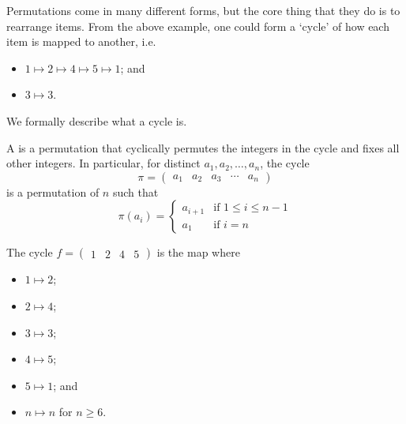 Permutations come in many different forms, but the core thing that they do is to rearrange items. From the above example, one could form a `cycle' of how each item is mapped to another, i.e.
\begin{itemize}
    \item $1 \mapsto 2 \mapsto 4 \mapsto 5 \mapsto 1$; and
    \item $3 \mapsto 3$.
\end{itemize}
We formally describe what a cycle is.
\begin{definition}
    A  is a permutation that cyclically permutes the integers in the cycle and fixes all other integers. In particular, for distinct $a_1, a_2, \dots, a_n$, the cycle
    \[
        \pi = \begin{pmatrix}a_1&a_2&a_3&\cdots&a_n\end{pmatrix}
    \]
    is a permutation of  $n$ such that
    \[
        \pi(a_i) = \begin{cases}
            a_{i+1}& \text{if } 1 \leq i \leq n - 1\\
            a_1 & \text{if } i = n
        \end{cases}
    \]
\end{definition}
\begin{example}
    The cycle $f = \begin{pmatrix}1 & 2 & 4 & 5\end{pmatrix}$ is the map where
    \begin{multicols}{3}
        \begin{itemize}
            \item $1 \mapsto 2$;
            \item $2 \mapsto 4$;
            \item $3 \mapsto 3$;
            \item $4 \mapsto 5$;
            \item $5 \mapsto 1$; and
            \item $n \mapsto n$ for $n \geq 6$.
        \end{itemize}
    \end{multicols}
\end{example}


